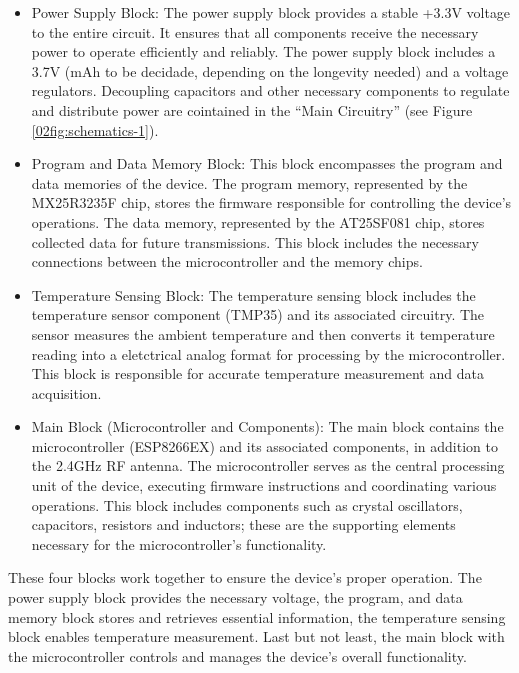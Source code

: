 \begin{itemize}
    \item Power Supply Block: The power supply block provides a stable +3.3V voltage to the entire circuit. It ensures 
    that all components receive the necessary power to operate efficiently and reliably. The power supply block includes a 3.7V (mAh to be
    decidade, depending on the longevity needed) and a voltage regulators. Decoupling capacitors and other necessary components to regulate and 
    distribute power are cointained in the ``Main Circuitry'' (see Figure \ref{02fig:schematics-1}).

    \item Program and Data Memory Block: This block encompasses the program and data memories of the device. The program memory, 
    represented by the MX25R3235F chip, stores the firmware responsible for controlling the device's operations. The data memory, 
    represented by the AT25SF081 chip, stores collected data for future transmissions. This block includes the necessary 
    connections between the microcontroller and the memory chips.

    \item Temperature Sensing Block: The temperature sensing block includes the temperature sensor component (TMP35) and its 
    associated circuitry. The sensor measures the ambient temperature and then converts it temperature reading 
    into a eletctrical analog format for processing by the microcontroller. This block is responsible for accurate temperature measurement and 
    data acquisition.

    \item Main Block (Microcontroller and Components): The main block contains the microcontroller (ESP8266EX) and its associated
     components, in addition to the 2.4GHz RF antenna. The microcontroller serves as the central processing unit of the device, executing firmware 
     instructions and coordinating various operations. This block includes components such as crystal oscillators, capacitors, resistors and 
     inductors; these are the supporting elements necessary for the microcontroller's functionality.


\end{itemize}



These four blocks work together to ensure the device's proper operation. The power supply block provides the necessary voltage, 
the program, and data memory block stores and retrieves essential information, the temperature sensing block enables temperature 
measurement. Last but not least, the main block with the microcontroller controls and manages the device's overall functionality.


